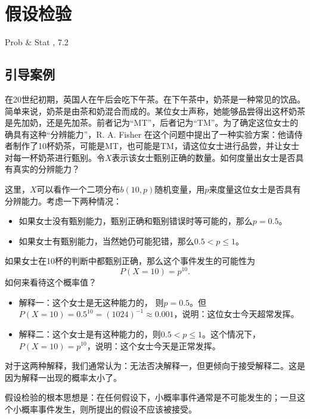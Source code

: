 \chapter{假设检验}
\begin{introduction}
  \item Prob \& Stat , 7.2  
\end{introduction}
\section{引导案例}
\begin{instance}[（女士品茶）]

    在20世纪初期，英国人在午后会吃下午茶。在下午茶中，奶茶是一种常见的饮品。简单来说，奶茶是由茶和奶混合而成的。某位女士声称，她能够品尝得出这杯奶茶是先加奶，还是先加茶。前者记为“MT”，后者记为“TM”。为了确定这位女士的确具有这种“分辨能力”，R. A. Fisher 在这个问题中提出了一种实验方案：他请侍者制作了10杯奶茶，可能是MT，也可能是TM，请这位女士进行品尝，并让女士对每一杯奶茶进行甄别。令$X$表示该女士甄别正确的数量。如何度量出女士是否具有真实的分辨能力？

    这里，$X$可以看作一个二项分布$b(10,p)$随机变量，用$p$来度量这位女士是否具有分辨能力。考虑一下两种情况：
    \begin{itemize}
        \item 如果女士没有甄别能力，甄别正确和甄别错误时等可能的，那么$p=0.5$。
        \item 如果女士有甄别能力，当然她仍可能犯错，那么$0.5<p\leq 1$。
    \end{itemize}
    
    如果女士在10杯的判断中都甄别正确，那么这个事件发生的可能性为
    $$
    P(X= 10)= p^{10}. 
    $$
    如何来看待这个概率值？
    \begin{itemize}
        \item 解释一：这个女士是无这种能力的， 则$p=0.5$。但$P(X=10) = {0.5}^{10} = (1024)^{-1} \approx 0.001$，说明：这位女士今天超常发挥。
        \item 解释二：这个女士是有这种能力的，则$0.5<p\leq1$。这个情况下，$P(X=10) = p^{10} $，说明：这个女士今天是正常发挥。
    \end{itemize}
    对于这两种解释，我们通常认为：无法否决解释一，但更倾向于接受解释二。这是因为解释一出现的概率太小了。
    
\end{instance}
\begin{remark}
    假设检验的根本思想是：在任何假设下，小概率事件通常是不可能发生的；一旦这个小概率事件发生，则所提出的假设不应该被接受。
\end{remark}
\begin{note}
    \vspace{5cm}
\end{note}

